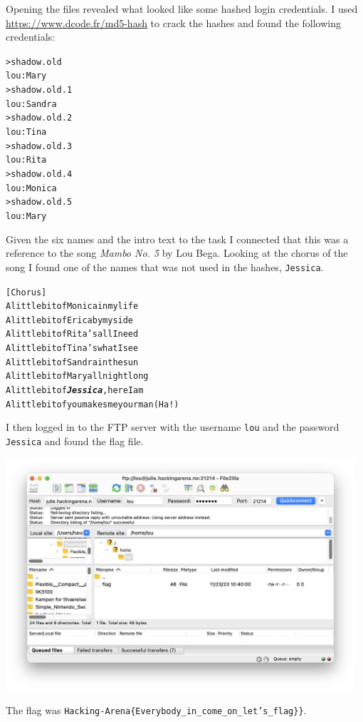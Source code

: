 Opening the files revealed what looked like some hashed login credentials. I used \url{https://www.dcode.fr/md5-hash} to crack the hashes and found the following credentials:

\begin{alltt}
> shadow.old
lou:Mary
> shadow.old.1
lou:Sandra
> shadow.old.2
lou:Tina
> shadow.old.3
lou:Rita
> shadow.old.4
lou:Monica
> shadow.old.5
lou:Mary
\end{alltt}

Given the six names and the intro text to the task I connected that this was a reference to the song \textit{Mambo No. 5} by Lou Bega. Looking at the chorus of the song I found one of the names that was not used in the hashes, \texttt{Jessica}.

\begin{alltt}
[Chorus]
A little bit of Monica in my life
A little bit of Erica by my side
A little bit of Rita's all I need
A little bit of Tina's what I see
A little bit of Sandra in the sun
A little bit of Mary all night long
A little bit of \textbf{\emph{Jessica}}, here I am
A little bit of you makes me your man (Ha!)
\end{alltt}

I then logged in to the FTP server with the username \texttt{lou} and the password \texttt{Jessica} and found the flag file.

\begin{center}
    \includegraphics[width=13cm]{img/Get in touch with services/5th challenge/Screenshot 2023-11-24 at 14.00.21.png}
\end{center}

The flag was \texttt{Hacking-Arena\{Everybody\_in\_come\_on\_let's\_flag\}\}}.